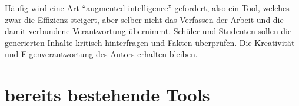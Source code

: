 \documentclass[../main.tex]{subfiles}
\begin{document}
Häufig wird eine Art "`augmented intelligence"' gefordert, also ein Tool, welches zwar die Effizienz steigert, aber selber nicht das Verfassen der 
Arbeit und die damit verbundene Verantwortung übernimmt. Schüler und Studenten sollen die generierten Inhalte kritisch hinterfragen und Fakten überprüfen. Die Kreativität und 
Eigenverantwortung des Autors erhalten bleiben.\cite{BucherSchwarzerHolzwweißig,humanWritingToAi,teachers,ZukunftWissenschaftlichesPublizieren} 

\section{bereits bestehende Tools}
\end{document}
